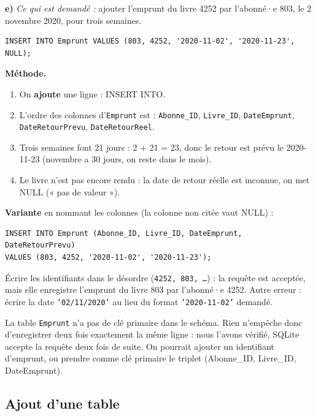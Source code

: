 \documentclass[11pt, a4paper]{exam}
\newcommand{\code}[1]{\texttt{#1}}
\newcommand{\rappel}[1]{\noindent\textit{Ce qui est demandé :} #1\par\smallskip}
\newcommand{\methode}{\noindent\textbf{Méthode.}\ }
\newcommand{\sql}[1]{\textsc{#1}}
\begin{document}
\textbf{e)} \rappel{ajouter l'emprunt du livre 4252 par l'abonné·e 803, le 2 novembre 2020, pour trois semaines.}
\begin{reponse}
\begin{lstlisting}[style=sqlc]
INSERT INTO Emprunt VALUES (803, 4252, '2020-11-02', '2020-11-23', NULL);
\end{lstlisting}
\end{reponse}
\methode
\begin{enumerate}
\item On \textbf{ajoute} une ligne : \sql{INSERT INTO}.
\item L'ordre des colonnes d'\code{Emprunt} est : \code{Abonne\_ID}, \code{Livre\_ID}, \code{DateEmprunt}, \code{Date\-Retour\-Prevu}, \code{Date\-Retour\-Reel}.
\item Trois semaines font 21 jours : 2 + 21 = 23, donc le retour est prévu le 2020-11-23 (novembre a 30 jours, on reste dans le mois).
\item Le livre n'est pas encore rendu : la date de retour réelle est inconnue, on met \sql{NULL} (« pas de valeur »).
\end{enumerate}
\textbf{Variante} en nommant les colonnes (la colonne non citée vaut \sql{NULL}) :
\begin{lstlisting}[style=sqlc]
INSERT INTO Emprunt (Abonne_ID, Livre_ID, DateEmprunt, DateRetourPrevu)
VALUES (803, 4252, '2020-11-02', '2020-11-23');
\end{lstlisting}

\begin{erreur}
Écrire les identifiants dans le désordre (\code{4252, 803, \ldots}) : la requête est acceptée, mais elle enregistre l'emprunt du livre 803 par l'abonné·e 4252. Autre erreur : écrire la date \code{'02/11/2020'} au lieu du format \code{'2020-11-02'} demandé.
\end{erreur}

\begin{remarque}
La table \code{Emprunt} n'a pas de clé primaire dans le schéma. Rien n'empêche donc d'enregistrer deux fois exactement la même ligne : nous l'avons vérifié, SQLite accepte la requête deux fois de suite. On pourrait ajouter un identifiant d'emprunt, ou prendre comme clé primaire le triplet (Abonne\_ID, Livre\_ID, DateEmprunt).
\end{remarque}

\subsection*{Ajout d'une table}
\end{document}
